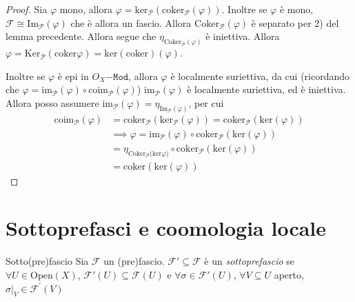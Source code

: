 \begin{proof}{}
  Sia \(\varphi \) mono, allora \(\varphi =
  \mathrm{ker}_\mathcal{P}{(\mathrm{coker}_\mathcal{P}{(\varphi )})}\). Inoltre
  se \(\varphi \) è mono, \(\mathcal{F} \cong \mathrm{Im}_\mathcal{P}{(\varphi
  )}\) che è allora un fascio. Allora \(\mathrm{Coker}_\mathcal{P} {(\varphi
  )}\) è separato per 2) del lemma precedente. Allora segue che
  \(\eta_{\mathrm{Coker}_\mathcal{P}{(\varphi )}} \) è iniettiva. Allora
  \(\varphi = \mathrm{Ker}_\mathcal{P}{(\mathrm{coker}\varphi )} =
  \mathrm{ker}{(\mathrm{coker})}{(\varphi)}\).

  Inoltre se \(\varphi \) è epi in \(O_X\mathtt{-Mod}\), allora \(\varphi \) è
  localmente suriettiva, da cui (ricordando che \(\varphi =
  \mathrm{im}_\mathcal{P}{(\varphi )} \circ \mathrm{coim}_\mathcal{P}{(\varphi
  )}\)) \(\mathrm{im}_\mathcal{P}{(\varphi )}\) è
  localmente suriettiva, ed è iniettiva. Allora posso assumere
  \(\mathrm{im}_\mathcal{P}{(\varphi )} = \eta_{\mathrm{Im}_\mathcal{P}{(\varphi
  )}} \), per cui
    \begin{align*}
        \mathrm{coim}_\mathcal{P}{(\varphi )}
        &= \mathrm{coker}_\mathcal{P}{(\mathrm{ker}_\mathcal{P}{(\varphi )})}
            = \mathrm{coker}_\mathcal{P}{(\mathrm{ker}{(\varphi )})} \\
        &\implies \varphi
            = \mathrm{im}_\mathcal{P}{(\varphi )} \circ
                \mathrm{coker}_\mathcal{P}{(\mathrm{ker}{(\varphi )})} \\
        &= \eta_{\mathrm{Coker}_\mathcal{P}{(\mathrm{ker} \varphi })} \circ
             \mathrm{coker}_\mathcal{P}{(\mathrm{ker}{(\varphi )})} \\
        &= \mathrm{coker}{(\mathrm{ker}{(\varphi )})}
    \end{align*}
\end{proof}

\section{Sottoprefasci e coomologia locale}

\begin{definition}{Sotto(pre)fascio}
    Sia \(\mathcal{F}\) un (pre)fascio. \(\mathcal{F}' \subseteq \mathcal{F} \)
    è un \emph{sottoprefascio} se \(\forall U \in \mathrm{Open}{(X)}\),
    \(\mathcal{F}'{(U)} \subseteq \mathcal{F}{(U)} \) e \(\forall \sigma \in
    \mathcal{F}'{(U)}\), \(\forall V \subseteq U \) aperto, \(\sigma|_{V} \in
    \mathcal{F}^{\prime}{(V)}\)
\end{definition}
    
